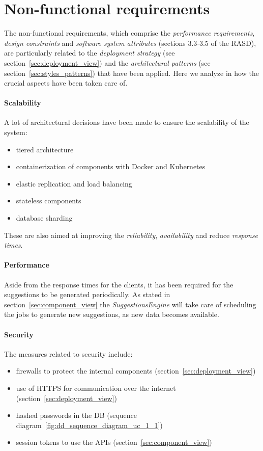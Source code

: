 \section{Non-functional requirements}
The non-functional requirements, which comprise the \emph{performance
requirements}, \emph{design constraints} and \emph{software system attributes}
(sections 3.3-3.5 of the RASD), are particularly related to the \emph{deployment
strategy} (see section~\ref{sec:deployment_view}) and the \emph{architectural patterns}
(see section~\ref{sec:styles_patterns}) that have been applied.
Here we analyze in how the crucial aspects have been taken care of.

\paragraph{Scalability}
A lot of architectural decisions have been made to ensure the scalability of
the system:
\begin{itemize}[noitemsep]
    \item tiered architecture
    \item containerization of components with Docker and Kubernetes
    \item elastic replication and load balancing
    \item stateless components
    \item database sharding
\end{itemize}
These are also aimed at improving the \emph{reliability}, \emph{availability}
and reduce \emph{response times}.

\paragraph{Performance}
Aside from the response times for the clients, it has been required for the
suggestions to be generated periodically. As stated in
section~\ref{sec:component_view} the \emph{SuggestionsEngine} will take care of
scheduling the jobs to generate new suggestions, as new data becomes available.

\paragraph{Security}
The measures related to security include:
\begin{itemize}[noitemsep]
    \item firewalls to protect the internal components
    (section~\ref{sec:deployment_view})
    \item use of HTTPS for communication over the internet
    (section~\ref{sec:deployment_view})
    \item hashed passwords in the DB
    (sequence diagram~\ref{fig:dd_sequence_diagram_uc_1_1})
    \item session tokens to use the APIs (section~\ref{sec:component_view})
\end{itemize}


